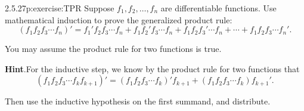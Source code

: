 \documentclass[twoside,11pt,]{book}
\newcommand{\blocktitlefont}{\relax}
\numberwithin{equation}{chapter}
\begin{document}
\begin{divisionsolution}{2.5.27}{}{p:exercise:TPR}%
Suppose \(f_1, f_2, \ldots, f_n\) are differentiable functions. Use mathematical induction to prove the generalized product rule:%
\begin{equation*}
(f_1 f_2 f_3 \cdots f_n)' = f_1' f_2 f_3 \cdots f_n + f_1 f_2' f_3 \cdots f_n + f_1 f_2 f_3' \cdots f_n + \cdots + f_1 f_2 f_3 \cdots f_n'\text{.}
\end{equation*}
%
\par
You may assume the product rule for two functions is true.%
\par\smallskip%
\noindent\textbf{\blocktitlefont Hint}.\quad{}For the inductive step, we know by the product rule for two functions that%
\begin{equation*}
(f_1f_2f_3 \cdots f_k f_{k+1})' = (f_1f_2f_3\cdots f_k)'f_{k+1} + (f_1f_2f_3\cdots f_k)f_{k+1}'\text{.}
\end{equation*}
%
\par
Then use the inductive hypothesis on the first summand, and distribute.%
\end{divisionsolution}%
\end{document}
